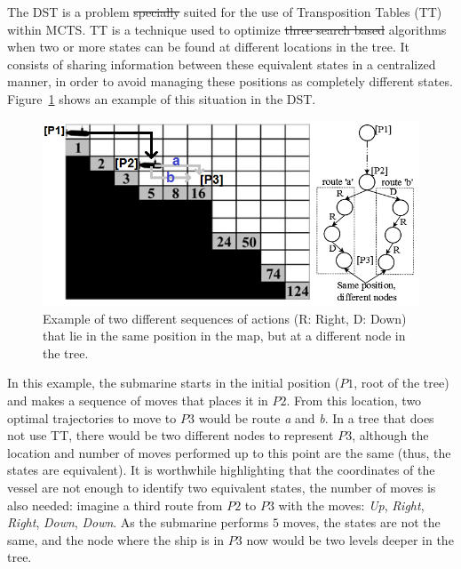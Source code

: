 \documentclass[journal]{IEEEtran}
\providecommand{\DIFaddtex}[1]{{\protect\color{blue}\uwave{#1}}} %
\providecommand{\DIFdeltex}[1]{{\protect\color{red}\sout{#1}}}                      %
\providecommand{\DIFaddbegin}{} %
\providecommand{\DIFaddend}{} %
\providecommand{\DIFdelbegin}{} %
\providecommand{\DIFdelend}{} %
\providecommand{\DIFadd}[1]{\texorpdfstring{\DIFaddtex{#1}}{#1}} %
\providecommand{\DIFdel}[1]{\texorpdfstring{\DIFdeltex{#1}}{}} %
\begin{document}
The DST is a problem \DIFdelbegin \DIFdel{specially }\DIFdelend \DIFaddbegin \DIFadd{especially }\DIFaddend suited for the use of Transposition Tables (TT)~\cite{Childs2008} within MCTS. TT is a technique used to optimize \DIFdelbegin \DIFdel{three search based }\DIFdelend \DIFaddbegin \DIFadd{tree search-based }\DIFaddend algorithms when two or more states can be found at different locations in the tree. It consists of sharing information between these equivalent states in a centralized manner, in order to avoid managing these positions as completely different states. Figure~\ref{fig:dstTable} shows an example of this situation in the DST.

\begin{figure}[!t]
\begin{center}
\includegraphics[width=0.9\columnwidth]{img/dstTransTables}
\end{center}
\caption{Example of two different sequences of actions (R: Right, D: Down) that lie in the same position in the map, but at a different node in the tree.}
\label{fig:dstTable}
\end{figure}

In this example, the submarine starts in the initial position ($P1$, root of the tree) and makes a sequence of moves that places it in $P2$. From this location, two optimal trajectories to move to $P3$ would be route \textit{a} and \textit{b}. In a tree that does not use TT, there would be two different nodes to represent $P3$, although the location and number of moves performed up to this point are the same (thus, the states are equivalent). It is worthwhile highlighting that the coordinates of the vessel are not enough to identify two equivalent states, the number of moves is also needed: imagine a third route from $P2$ to $P3$ with the moves: \textit{Up}, \textit{Right}, \textit{Right}, \textit{Down}, \textit{Down}. As the submarine performs $5$ moves, the states are not the same, and the node where the ship is in $P3$ now would be two levels deeper in the tree.
\end{document}
